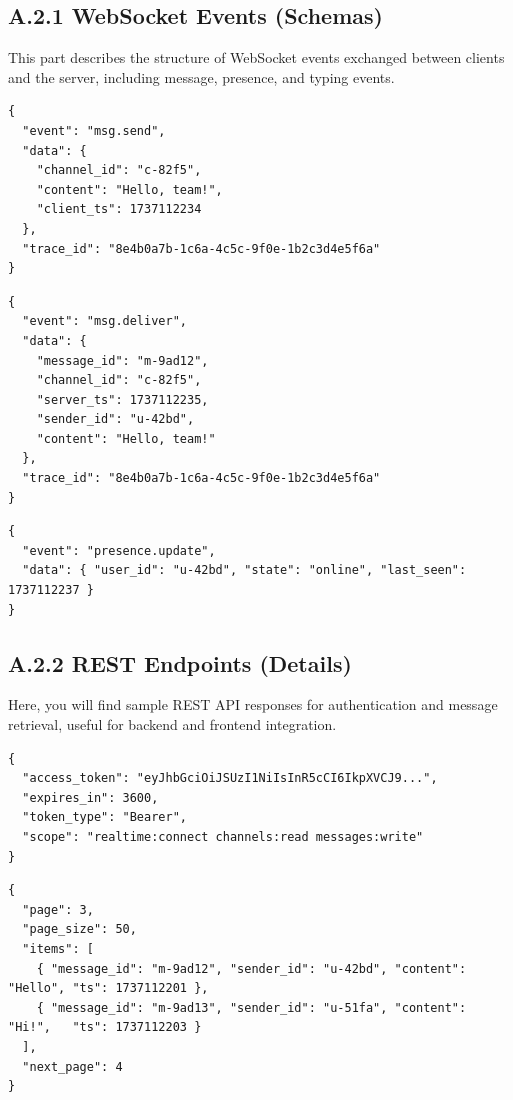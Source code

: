 \subsection*{A.2.1 WebSocket Events (Schemas)}
This part describes the structure of WebSocket events exchanged between clients and the server, including message, presence, and typing events.
\begin{lstlisting}[language={}, caption={Client -> Server: msg.send}]
{
  "event": "msg.send",
  "data": {
    "channel_id": "c-82f5",
    "content": "Hello, team!",
    "client_ts": 1737112234
  },
  "trace_id": "8e4b0a7b-1c6a-4c5c-9f0e-1b2c3d4e5f6a"
}
\end{lstlisting}

\begin{lstlisting}[language={}, caption={Server -> Client: msg.deliver}]
{
  "event": "msg.deliver",
  "data": {
    "message_id": "m-9ad12",
    "channel_id": "c-82f5",
    "server_ts": 1737112235,
    "sender_id": "u-42bd",
    "content": "Hello, team!"
  },
  "trace_id": "8e4b0a7b-1c6a-4c5c-9f0e-1b2c3d4e5f6a"
}
\end{lstlisting}

\begin{lstlisting}[language={}, caption={Presence and typing events (bidirectional)}]
{
  "event": "presence.update",
  "data": { "user_id": "u-42bd", "state": "online", "last_seen": 1737112237 }
}
\end{lstlisting}

\subsection*{A.2.2 REST Endpoints (Details)}
Here, you will find sample REST API responses for authentication and message retrieval, useful for backend and frontend integration.
\begin{lstlisting}[language={}, caption={POST /v1/auth/token (response)}]
{
  "access_token": "eyJhbGciOiJSUzI1NiIsInR5cCI6IkpXVCJ9...",
  "expires_in": 3600,
  "token_type": "Bearer",
  "scope": "realtime:connect channels:read messages:write"
}
\end{lstlisting}

\begin{lstlisting}[language={}, caption={GET /v1/messages?channel=:id\&page=:n (response)}]
{
  "page": 3,
  "page_size": 50,
  "items": [
    { "message_id": "m-9ad12", "sender_id": "u-42bd", "content": "Hello", "ts": 1737112201 },
    { "message_id": "m-9ad13", "sender_id": "u-51fa", "content": "Hi!",   "ts": 1737112203 }
  ],
  "next_page": 4
}
\end{lstlisting}

